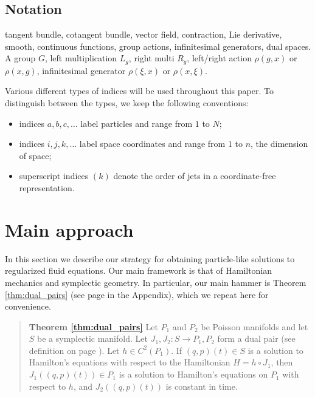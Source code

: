 \documentclass[12pt]{amsart}
\begin{document}
\subsection{Notation}
tangent bundle, cotangent bundle, vector field, contraction, Lie derivative,
smooth, continuous functions, group actions, infinitesimal generators,
dual spaces.  A group $G$, left multiplication $L_g$, right multi $R_g$, 
left/right action $\rho(g,x)$ or $\rho(x,g)$, infinitesimal generator $\rho(\xi,x)$ or $\rho(x,\xi)$.

Various different types of indices will be used throughout this paper.
To distinguish between the types, we keep the following
conventions:
\begin{itemize}
\item indices $a,b,c,\ldots$ label particles and range from $1$ to $N$;
\item indices $i,j,k,\ldots$ label space coordinates and range from
  $1$ to $n$, the dimension of space;
\item superscript indices $(k)$ denote the order of jets in a
  coordinate-free representation.
\end{itemize}




\section{Main approach}
\label{sec:approach}
In this section we describe our strategy for obtaining
particle-like solutions to regularized fluid equations.
Our main framework is that of Hamiltonian mechanics
and symplectic geometry.
In particular, our main hammer is Theorem \ref{thm:dual_pairs} (see page 
\pageref{thm:dual_pairs} in the Appendix), which we repeat
here for convenience.
  \begin{quote}
    {\bf Theorem \ref{thm:dual_pairs}}
    Let $P_1$ and $P_2$ be Poisson manifolds and let $S$ be
    a symplectic manifold.  Let $J_1,J_2:S \to P_1,P_2$ form a dual pair 
    (see definition on page \pageref{thm:dual_pairs}).
    Let $h \in C^2(P_1)$.
    If $(q,p)(t) \in S$ is a solution to Hamilton's equations
    with respect to the Hamiltonian $H = h \circ J_1$,
    then $J_1\left( (q,p)(t) \right) \in P_1$ is a solution
    to Hamilton's equations on $P_1$ with respect to $h$,
    and $J_2( (q,p)(t))$ is constant in time.
  \end{quote}
\end{document}
